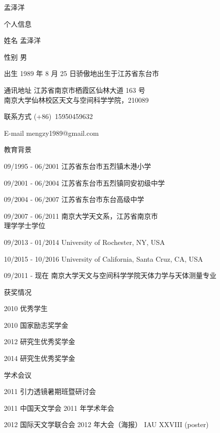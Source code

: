 \begin{resume}

\begin{cv}{\hfill 孟泽洋}
\begin{cvlist}{个人信息}
\setlength{\itemsep}{-0.250\baselineskip plus 0.2em minus 0.2em}
\item[姓名] 孟泽洋 
\item[性别] 男
\item[出生]  1989 年 8 月 25 日骄傲地出生于江苏省东台市
\item[通讯地址]  江苏省南京市栖霞区仙林大道 163 号 \\
 			 南京大学仙林校区天文与空间科学学院，210089 
\item[联系方式]   (+86)~15950459632
\item[E-mail] mengzy1989@gmail.com
\end{cvlist}
\begin{cvlist}{教育背景}
\setlength{\itemsep}{-0.250\baselineskip plus 0.2em minus 0.2em}
\item[09/1995 - 06/2001] 江苏省东台市五烈镇木港小学
\item[09/2001 - 06/2004] 江苏省东台市五烈镇同安初级中学
\item[09/2004 - 06/2007] 江苏省东台市东台高级中学
\item[09/2007 - 06/2011] 南京大学天文系，江苏省南京市 \\ 
				      理学学士学位
\item[09/2013 - 01/2014] University of Rochester, NY, USA
\item[10/2015 - 10/2016] University of California, Santa Cruz, CA, USA
\item[09/2011 - 现在] 南京大学天文与空间科学学院天体力学与天体测量专业
\end{cvlist}
\begin{cvlist}{获奖情况}
\setlength{\itemsep}{-0.250\baselineskip plus 0.2em minus 0.2em}
\item[2010]  优秀学生
\item[2010]  国家励志奖学金
\item[2012]  研究生优秀奖学金
\item[2014]  研究生优秀奖学金
\end{cvlist}
\begin{cvlist}{学术会议}
\setlength{\itemsep}{-0.250\baselineskip plus 0.2em minus 0.2em}
\item[2011]   引力透镜暑期班暨研讨会
\item[2011]   中国天文学会 2011 年学术年会
\item[2012]   国际天文学联合会 2012 年大会（海报） IAU XXVIII (poster)

\end{cvlist}
\end{cv}
\end{resume}
